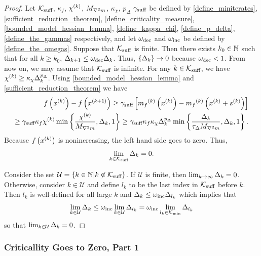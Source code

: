 \begin{proof}
Let
${\mathcal K_{\textrm{suff}}}$, $\kappa_f$, ${\chi^{(k)}}$, ${M_{\nabla^2 m}}$, $\kappa_{\chi}$, $p_{\Delta}$ $\gamma_{\textrm{suff}}$
be defined by
\cref{define_miniterates}, \cref{sufficient_reduction_theorem}, \cref{define_criticality_measure}, \cref{bounded_model_hessian_lemma}, \cref{define_kappa_chi}, \cref{define_p_delta}, \cref{define_the_gammas}
respectively,
and let $\omega_{\text{dec}}$ and $\omega_{\text{inc}}$ be defined by \cref{define_the_omegas}.
Suppose that ${\mathcal K_{\textrm{suff}}}$ is finite.
Then there exists $k_0 \in \mathbb N$ such that for all $k \ge  k_0$, $\Delta_{k+1} \le \omega_{\text{dec}} \Delta_k$.
Thus, $\left\{\Delta_k\right\} \to 0$ because $\omega_{\text{dec}} < 1$.
From now on, we may assume that ${\mathcal K_{\textrm{suff}}}$ is infinite.  
For any $k \in {\mathcal K_{\textrm{suff}}}$, we have ${\chi^{(k)}} \ge \kappa_{\chi}\Delta_k^{p_{\Delta}}$.
Using \cref{bounded_model_hessian_lemma} and \cref{sufficient_reduction_theorem} we have
\begin{align*}
f\left(x^{(k)}\right) - f\left({{x}^{(k+1)}}\right) \ge \gamma_{\textrm{suff}} \left[{{m}_f}^{(k)}\left(x^{(k)}\right) - {{m}_f}^{(k)}\left(x^{(k)} + {{s}^{(k)}}\right)\right] \\
\ge \gamma_{\textrm{suff}} \kappa_f {\chi^{(k)}} \min\left\{\frac{{\chi^{(k)}}}{{M_{\nabla^2 m}}}, \Delta_k, 1\right\}
\ge \gamma_{\textrm{suff}} \kappa_f \kappa_{\chi}\Delta_k^{p_{\Delta}}\min\left\{\frac{\Delta_k}{\tau_{\Delta} {M_{\nabla^2 m}}}, \Delta_k, 1\right\}.
\end{align*}
% 
Because $f\left(x^{(k)}\right)$ is nonincreasing, the left hand side goes to zero.
Thus,
\begin{align}
\lim_{k \in {\mathcal K_{\textrm{suff}}}} \Delta_k = 0.
\end{align}

Consider the set
$\mathcal U = \{ k \in \mathbb N | k \not \in {\mathcal K_{\textrm{suff}}} \}$.
If $\mathcal U$ is finite, then $\lim_{k\to\infty}\Delta_k = 0$.
Otherwise, consider $k \in \mathcal U$ and define $l_k$ to be the last index in ${\mathcal K_{\textrm{suff}}}$ before $k$.
Then $l_k$ is well-defined for all large $k$  and $\Delta_k \le \omega_{\text{inc}} \Delta_{l_k}$ which implies that
\begin{align}
\lim_{k \in \mathcal U } \Delta_k \le \omega_{\text{inc}} \lim_{k \in \mathcal U} \Delta_{l_k} = \omega_{\text{inc}} \lim_{l_k \in {\mathcal K_{\textrm{min}}}} \Delta_{l_k}
\end{align}
so that $\lim_{k \in \mathcal U} \Delta_k = 0$.
\end{proof}


\subsubsection{Criticallity Goes to Zero, Part 1}

